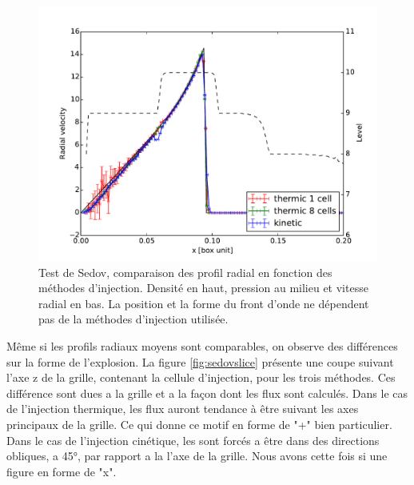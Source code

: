 \begin{figure}[htpb]
		\includegraphics[height=.3\textheight]{img/03/sedov/sedov_comp_profile_vel.pdf} 
        \caption{Test de Sedov, comparaison des profil radial en fonction des  méthodes d'injection. 
        Densité en haut, pression au milieu et vitesse radial en bas.
        La position et la forme du front d'onde ne dépendent pas de la méthodes d'injection utilisée.}
 		\label{fig:sedovmethod} 
\end{figure}


Même si les profils radiaux moyens sont comparables, on observe des différences sur la forme de l'explosion.
La figure \ref{fig:sedovslice} présente une coupe suivant l'axe z de la grille, contenant la cellule d'injection, pour les trois méthodes.
Ces différence sont dues a la grille et a la façon dont les flux sont calculés.
Dans le cas de l'injection thermique, les flux auront tendance à être suivant les axes principaux de la grille.
Ce qui donne ce motif en forme de "+" bien particulier.
Dans le cas de l'injection cinétique, les sont forcés a être dans des directions obliques, a 45°, par rapport a la l'axe de la grille.
Nous avons cette fois si une figure en forme de "x".

